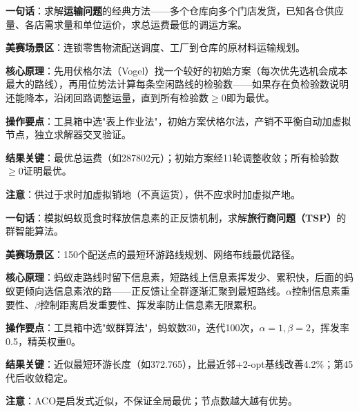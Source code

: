 
\begin{algobrief}
\textbf{一句话}：求解\textbf{运输问题}的经典方法——多个仓库向多个门店发货，已知各仓供应量、各店需求量和单位运价，求总运费最低的调运方案。

\textbf{美赛场景区}：连锁零售物流配送调度、工厂到仓库的原材料运输规划。

\textbf{核心原理}：先用伏格尔法（Vogel）找一个较好的初始方案（每次优先选机会成本最大的路线），再用位势法计算每条空闲路线的检验数——如果存在负检验数说明还能降本，沿闭回路调整运量，直到所有检验数$\geq 0$即为最优。

\textbf{操作要点}：工具箱中选"表上作业法"，初始方案伏格尔法，产销不平衡自动加虚拟节点，独立求解器交叉验证。

\textbf{结果关键}：最优总运费（如287802元）；初始方案经11轮调整收敛；所有检验数$\geq 0$证明最优。

\textbf{注意}：供过于求时加虚拟销地（不真运货），供不应求时加虚拟产地。
\end{algobrief}


\begin{algobrief}
\textbf{一句话}：模拟蚂蚁觅食时释放信息素的正反馈机制，求解\textbf{旅行商问题（TSP）}的群智能算法。

\textbf{美赛场景区}：150个配送点的最短环游路线规划、网络布线最优路径。

\textbf{核心原理}：蚂蚁走路线时留下信息素，短路线上信息素挥发少、累积快，后面的蚂蚁更倾向选信息素浓的路——正反馈让全群逐渐汇聚到最短路线。$\alpha$控制信息素重要性、$\beta$控制距离启发重要性、挥发率防止信息素无限累积。

\textbf{操作要点}：工具箱中选"蚁群算法"，蚂蚁数30，迭代100次，$\alpha=1, \beta=2$，挥发率0.5，精英权重0。

\textbf{结果关键}：近似最短环游长度（如372.765），比最近邻+2-opt基线改善4.2\%；第45代后收敛稳定。

\textbf{注意}：ACO是启发式近似，不保证全局最优；节点数越大越有优势。
\end{algobrief}


